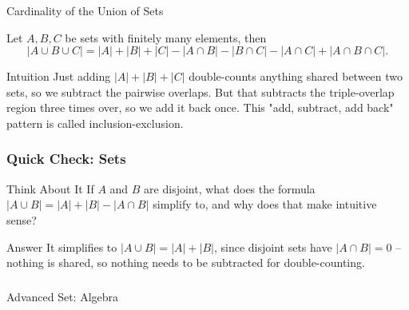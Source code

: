 \begin{frame}{Cardinality of the Union of Sets}

\begin{theorem} Let $A,B,C$ be sets with finitely many elements, then
$$|A\cup B \cup C|=|A|+|B|+|C|-|A\cap B|-|B\cap C|-|A\cap C|+|A\cap B \cap C|.$$
\end{theorem}

\begin{block}{Intuition}
Just adding $|A|+|B|+|C|$ double-counts anything shared between two sets, so we subtract the pairwise overlaps. But that subtracts the triple-overlap region three times over, so we add it back once. This "add, subtract, add back" pattern is called inclusion-exclusion.
\end{block}
\end{frame}

\begin{frame}[fragile]\frametitle{Quick Check: Sets}
\begin{block}{Think About It}
If $A$ and $B$ are disjoint, what does the formula $|A\cup B|=|A|+|B|-|A\cap B|$ simplify to, and why does that make intuitive sense?
\end{block}
\pause
\begin{block}{Answer}
It simplifies to $|A\cup B|=|A|+|B|$, since disjoint sets have $|A\cap B|=0$ -- nothing is shared, so nothing needs to be subtracted for double-counting.
\end{block}
\end{frame}

\begin{frame}[fragile]\frametitle{}
\begin{center}
{\Large Advanced Set: Algebra}
\end{center}
\end{frame}


